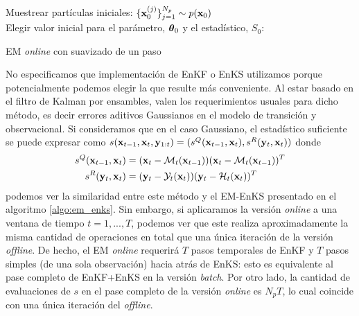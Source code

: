 \begin{algorithm}[H]\label{algo:onlineEM_OSS}
    
    Muestrear partículas iniciales: $\{\mathbf{x}_0^{(j)}\}_{j=1}^{N_p} \sim p(\mathbf{x}_0)$ \\
    Elegir valor inicial para el parámetro, $\mbox{\boldmath$ \theta $}_0$ y el estadístico, $\widehat{S_0}$: \\
    \caption{EM \textit{online} con suavizado de un paso}
\end{algorithm}
No especificamos que implementación de EnKF o EnKS utilizamos porque potencialmente podemos elegir la que resulte más conveniente. Al estar basado en el filtro de Kalman por ensambles, valen los requerimientos usuales para dicho método, es decir errores aditivos Gaussianos en el modelo de transición y observacional. Si consideramos que en el caso Gaussiano, el estadístico suficiente 
se puede expresar como $s(\mathbf{x}_{t-1}, \mathbf{x}_t, \mathbf{y}_{1:t}) = (s^Q(\mathbf{x}_{t-1}, \mathbf{x}_t), s^R(\mathbf{y}_t, \mathbf{x}_t))$ donde
\begin{align*}
    s^Q(\mathbf{x}_{t-1}, \mathbf{x}_t) &= (\mathbf{x}_t - \mathcal{M}_t(\mathbf{x}_{t-1}))(\mathbf{x}_t - \mathcal{M}_t(\mathbf{x}_{t-1}))^T \\
    s^R(\mathbf{y}_t, \mathbf{x}_t) &= (\mathbf{y}_t - \mathcal{Y}_t(\mathbf{x}_t))(\mathbf{y}_t - \mathcal{H}_t(\mathbf{x}_t))^T
\end{align*}
podemos ver la similaridad entre este método y el EM-EnKS presentado en el algoritmo \ref{algo:em_enks}. Sin embargo, si aplicaramos  la versión \textit{online} a una ventana de tiempo $t = 1, ..., T$, podemos ver que este realiza aproximadamente la misma cantidad de operaciones en total que una única iteración de la versión \textit{offline}. De hecho, el EM \textit{online} requerirá $T$ pasos temporales de EnKF y $T$ pasos simples (de una sola observación) hacia atrás de EnKS: esto es equivalente al pase completo de EnKF+EnKS en la versión \textit{batch}. Por otro lado, la cantidad de evaluaciones de $s$ en el pase completo de la versión \textit{online} es $N_pT$, lo cual coincide con una única iteración del \textit{offline}.

